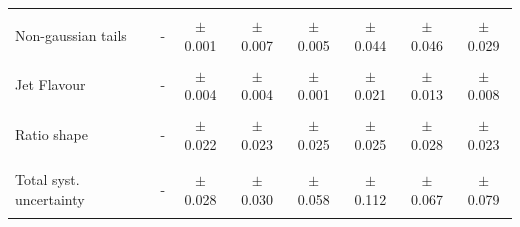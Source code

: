 \begin{table}[!hp]
\begin{tabular}{lcccccccc}
 & & & & & & & & \\
 Non-gaussian tails & & - & $\pm$ 0.001 & $\pm$ 0.007 & $\pm$ 0.005  & $\pm$ 0.044  & $\pm$ 0.046 & $\pm$ 0.029 \\
 & & & & & & & & \\ 
 Jet Flavour & & - & $\pm$ 0.004 & $\pm$ 0.004 & $\pm$ 0.001 & $\pm$ 0.021 & $\pm$ 0.013 & $\pm$ 0.008 \\
 & & & & & & & & \\ 
 Ratio shape & & - & $\pm$ 0.022 & $\pm$ 0.023 & $\pm$ 0.025 & $\pm$ 0.025 & $\pm$ 0.028 & $\pm$ 0.023 \\
 & & & & & & & & \\ 
\hline
 & & & & & & & & \\
 Total syst. uncertainty & & - & $\pm$ 0.028 & $\pm$ 0.030 & $\pm$ 0.058 & $\pm$ 0.112 & $\pm$ 0.067 & $\pm$ 0.079 \\
 & & & & & & & & \\ 
\hline
\end{tabular}%
\end{table} 

